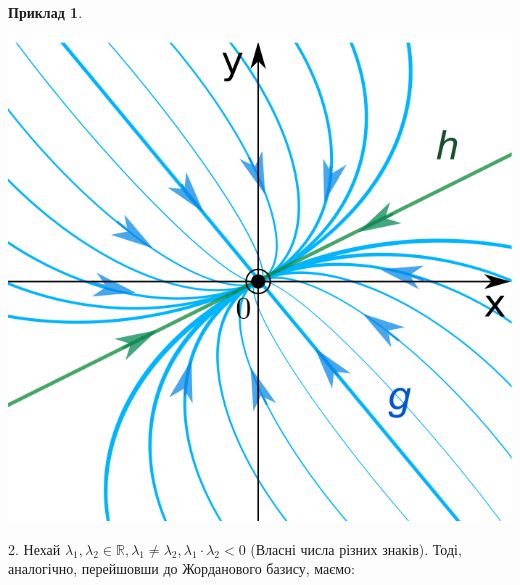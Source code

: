 \documentclass[14pt,a4paper]{scrartcl}
\theoremstyle{definition}
\newtheorem*{example}{Приклад}
\theoremstyle{definition}
\theoremstyle{definition}
\begin{document}
\begin{example}
    \begin{center} \includegraphics[scale=0.5]{assets/lectures_recent-06adae22.png} \end{center}
\end{example}

2. Нехай $ \lambda_1 , \lambda_2 \in \mathbb{R}, \lambda_1 \neq \lambda_2, \lambda_1 \cdot \lambda_2 < 0$ (Власні числа різних знаків).
Тоді, аналогічно, перейшовши до Жорданового базису, маємо:
\end{document}

